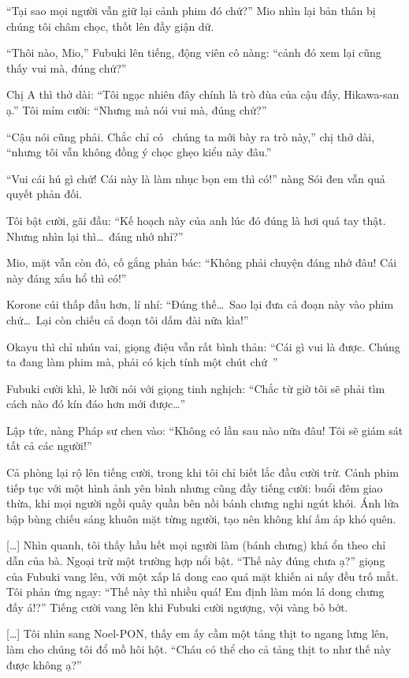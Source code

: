 \documentclass[../main.tex]{subfiles}
\begin{document}
``Tại sao mọi người vẫn giữ lại cảnh phim đó chứ?'' Mio nhìn lại bản thân bị chúng tôi châm chọc, thốt lên đầy giận dữ.

``Thôi nào, Mio,'' Fubuki lên tiếng, động viên cô nàng: ``cảnh đó xem lại cũng thấy vui mà, đúng chứ?''

Chị A thì thở dài: ``Tôi ngạc nhiên đây chính là trò đùa của cậu đấy, Hikawa-san ạ.'' Tôi mỉm cười: ``Nhưng mà nói vui mà, đúng chứ?''

``Cậu nói cũng phải. Chắc chỉ có \hll\ chúng ta mới bày ra trò này,'' chị thở dài, ``nhưng tôi vẫn không đồng ý chọc ghẹo kiểu này đâu.''

``Vui cái hú gì chứ! Cái này là làm nhục bọn em thì có!'' nàng Sói đen vẫn quả quyết phản đối.

Tôi bật cười, gãi đầu: ``Kế hoạch này của anh lúc đó đúng là hơi quá tay thật. Nhưng nhìn lại thì\dots\ đáng nhớ nhỉ?''

Mio, mặt vẫn còn đỏ, cố gắng phản bác: ``Không phải chuyện đáng nhớ đâu! Cái này đáng xấu hổ thì có!''

Korone cúi thấp đầu hơn, lí nhí: ``Đúng thế\dots\ Sao lại đưa cả đoạn này vào phim chứ\dots\ Lại còn chiếu cả đoạn tôi dấm đài nữa kìa!''

Okayu thì chỉ nhún vai, giọng điệu vẫn rất bình thản: ``Cái gì vui là được. Chúng ta đang làm phim mà, phải có kịch tính một chút chứ~''

Fubuki cười khì, lè lưỡi nói với giọng tinh nghịch: ``Chắc từ giờ tôi sẽ phải tìm cách nào đó kín đáo hơn mới được\dots''

Lập tức, nàng Pháp sư chen vào: ``Không có lần sau nào nữa đâu! Tôi sẽ giám sát tất cả các người!''

Cả phòng lại rộ lên tiếng cười, trong khi tôi chỉ biết lắc đầu cười trừ. Cảnh phim tiếp tục với một hình ảnh yên bình nhưng cũng đầy tiếng cười: buổi đêm giao thừa, khi mọi người ngồi quây quần bên nồi bánh chưng nghi ngút khói. Ánh lửa bập bùng chiếu sáng khuôn mặt từng người, tạo nên không khí ấm áp khó quên.

\il

[\dots] Nhìn quanh, tôi thấy hầu hết mọi người làm (bánh chưng) khá ổn theo chỉ dẫn của bà. Ngoại trừ một trường hợp nổi bật. ``Thế này đúng chưa ạ?'' giọng của Fubuki vang lên, với một xấp lá dong cao quá mặt khiến ai nấy đều trố mắt. Tôi phản ứng ngay: ``Thế này thì nhiều quá! Em định làm món lá dong chưng đấy á!?'' Tiếng cười vang lên khi Fubuki cười ngượng, vội vàng bỏ bớt.

    [\dots] Tôi nhìn sang Noel-PON, thấy em ấy cầm một tảng thịt to ngang lưng lên, làm cho chúng tôi đổ mồ hôi hột. ``Cháu có thể cho cả tảng thịt to như thế này được không ạ?''
\end{document}

